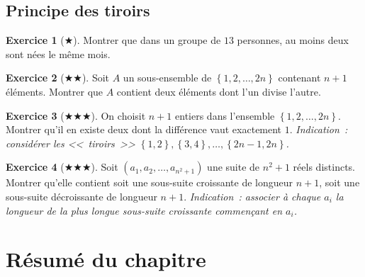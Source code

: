 \documentclass[12pt,a4paper,openany]{book}
\theoremstyle{definition}
\newtheorem{exercice}{Exercice}[chapter]
\theoremstyle{plain}
\theoremstyle{remark}
\newcommand{\set}[1]{\left\{#1\right\}}
\begin{document}
\subsection*{Principe des tiroirs}

\begin{exercice}[$\bigstar$]\label{exo:tiroirs-1}
  Montrer que dans un groupe de $13$ personnes, au moins deux sont n\'ees le m\^eme mois.
\end{exercice}

\begin{exercice}[$\bigstar\bigstar$]\label{exo:tiroirs-2}
  Soit $A$ un sous-ensemble de $\set{1, 2, \dots, 2n}$ contenant $n+1$ \'el\'ements. Montrer que $A$ contient deux \'el\'ements dont l'un divise l'autre.
\end{exercice}

\begin{exercice}[$\bigstar\bigstar\bigstar$]\label{exo:tiroirs-3}
  On choisit $n+1$ entiers dans l'ensemble $\set{1, 2, \dots, 2n}$. Montrer qu'il en existe deux dont la diff\'erence vaut exactement $1$.
  \textit{Indication~: consid\'erer les <<~tiroirs~>> $\set{1,2}, \set{3,4}, \dots, \set{2n-1, 2n}$.}
\end{exercice}

\begin{exercice}[$\bigstar\bigstar\bigstar$]\label{exo:tiroirs-4}
  Soit $(a_1, a_2, \dots, a_{n^2+1})$ une suite de $n^2+1$ r\'eels distincts. Montrer qu'elle contient soit une sous-suite croissante de longueur $n+1$, soit une sous-suite d\'ecroissante de longueur $n+1$.
  \textit{Indication~: associer \`a chaque $a_i$ la longueur de la plus longue sous-suite croissante commen\c{c}ant en $a_i$.}
\end{exercice}

\section*{R\'esum\'e du chapitre}
\end{document}
